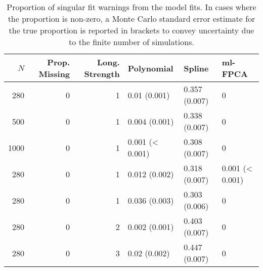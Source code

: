 \begin{table}[ht]
\centering
\begin{tabular}{rrrlll}
  \toprule
{\bfseries \small $N$} & {\bfseries \small Prop. Missing} & {\bfseries \small Long. Strength} & {\bfseries \small Polynomial} & {\bfseries \small Spline} & {\bfseries \small ml-FPCA} \\ 
  \midrule
280 & 0 & 1 & 0.01 (0.001) & 0.357 (0.007) & 0 \\ 
  500 & 0 & 1 & 0.004 (0.001) & 0.338 (0.007) & 0 \\ 
  1000 & 0 & 1 & 0.001 (< 0.001) & 0.308 (0.007) & 0 \\ 
  280 & 0 & 1 & 0.012 (0.002) & 0.318 (0.007) & 0.001 (< 0.001) \\ 
  280 & 0 & 1 & 0.036 (0.003) & 0.303 (0.006) & 0 \\ 
  280 & 0 & 2 & 0.002 (0.001) & 0.403 (0.007) & 0 \\ 
  280 & 0 & 3 & 0.02 (0.002) & 0.447 (0.007) & 0 \\ 
   \bottomrule
\end{tabular}
\caption{Proportion of singular fit warnings from the model fits. In cases where the proportion is non-zero, a Monte Carlo standard error estimate for the true proportion is reported in brackets to convey uncertainty due to the finite number of simulations.} 
\label{tab:singularity-table}
\end{table}
